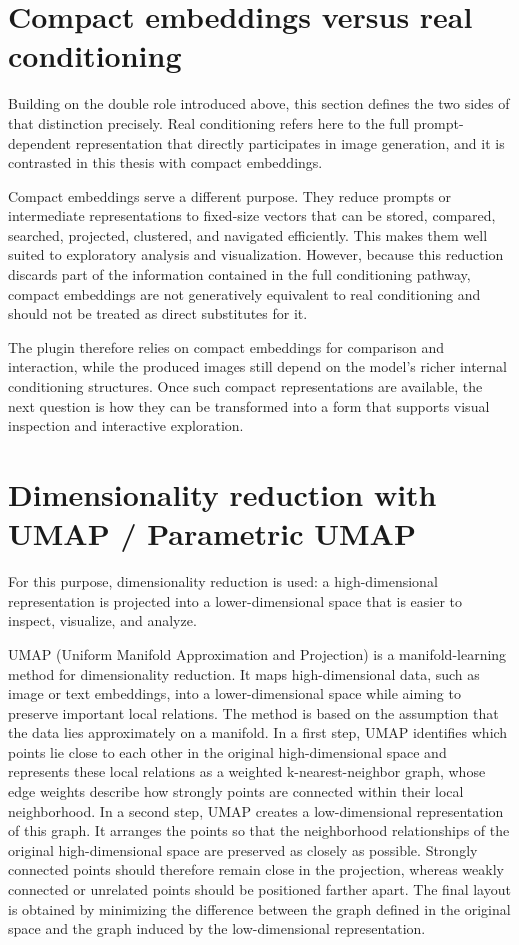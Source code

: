 \section{Compact embeddings versus real conditioning}\label{sec:2.3}

Building on the double role introduced above, this section defines the two sides of that distinction precisely. Real conditioning refers here to the full prompt-dependent representation that directly participates in image generation, and it is contrasted in this thesis with compact embeddings.

Compact embeddings serve a different purpose. They reduce prompts or intermediate representations to fixed-size vectors that can be stored, compared, searched, projected, clustered, and navigated efficiently. This makes them well suited to exploratory analysis and visualization. However, because this reduction discards part of the information contained in the full conditioning pathway, compact embeddings are not generatively equivalent to real conditioning and should not be treated as direct substitutes for it.

The plugin therefore relies on compact embeddings for comparison and interaction, while the produced images still depend on the model's richer internal conditioning structures.
Once such compact representations are available, the next question is how they can be transformed into a form that supports visual inspection and interactive exploration.

\section{Dimensionality reduction with UMAP / Parametric UMAP}\label{sec:2.4}

For this purpose, dimensionality reduction is used: a high-dimensional representation is projected into a lower-dimensional space that is easier to inspect, visualize, and analyze.

UMAP (Uniform Manifold Approximation and Projection) is a manifold-learning method for dimensionality reduction. It maps high-dimensional data, such as image or text embeddings, into a lower-dimensional space while aiming to preserve important local relations. The method is based on the assumption that the data lies approximately on a manifold. In a first step, UMAP identifies which points lie close to each other in the original high-dimensional space and represents these local relations as a weighted k-nearest-neighbor graph, whose edge weights describe how strongly points are connected within their local neighborhood.
In a second step, UMAP creates a low-dimensional representation of this graph. It arranges the points so that the neighborhood relationships of the original high-dimensional space are preserved as closely as possible. Strongly connected points should therefore remain close in the projection, whereas weakly connected or unrelated points should be positioned farther apart. The final layout is obtained by minimizing the difference between the graph defined in the original space and the graph induced by the low-dimensional representation. \cite{mcinnes2020umap}

